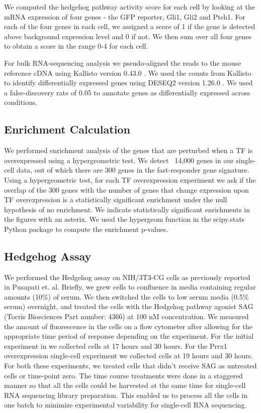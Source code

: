 We computed the hedgehog pathway activity score for each cell by looking at the mRNA expression of four genes - the GFP reporter,  Gli1, Gli2 and Ptch1. For each of the four genes in each cell, we assigned a score of 1 if the gene is detected above background expression level and 0 if not. We then sum over all four genes to obtain a score in the range 0-4 for each cell.

For bulk RNA-sequencing analysis we pseudo-aligned the reads to the mouse reference cDNA using Kallisto version 0.43.0 \cite{Bray2016-hc}. We used the counts from Kallisto to identify differentially expressed genes using DESEQ2 version 1.26.0 \cite{Love2014-lk}. We used a false-discovery rate of 0.05 to annotate genes as differentially expressed across conditions.

\subsection{Enrichment Calculation}
We performed enrichment analysis of the genes that are perturbed when a TF is overexpressed using a hypergeometric test. We detect ~14,000 genes in our single-cell data, out of which there are 300 genes in the fast-responder gene signature. Using a hypergeometric test, for each TF overexpression experiment we ask if the overlap of the 300 genes with the number of genes that change expression upon TF overexpression is a statistically significant enrichment under the null hypothesis of no enrichment. We indicate statistically significant enrichments in the figures with an asterix. We used the hypergeom function in the scipy.stats Python package to compute the enrichment p-values.

\subsection{Hedgehog Assay}
We performed the Hedgehog assay on NIH/3T3-CG cells as previously reported in Pusapati et. al. Briefly, we grew cells to confluence in media containing regular amounts (10\%) of serum. We then switched the cells to low serum media (0.5\% serum) overnight, and treated the cells with the Hedgehog pathway agonist SAG (Tocris Biosciences Part number: 4366) at 100 nM concentration. We measured the amount of fluorescence in the cells on a flow cytometer after allowing for the appropriate time period of response depending on the experiment. For the initial experiment in  we collected cells at 17 hours and 30 hours. For the Prrx1 overexpression single-cell experiment we collected cells at 19 hours and 30 hours. For both these experiments, we treated cells that didn’t receive SAG as untreated cells or time-point zero. The time course treatments were done in a staggered manner so that all the cells could be harvested at the same time for single-cell RNA sequencing library preparation. This enabled us to process all the cells in one batch to minimize experimental variability for single-cell RNA sequencing. 

